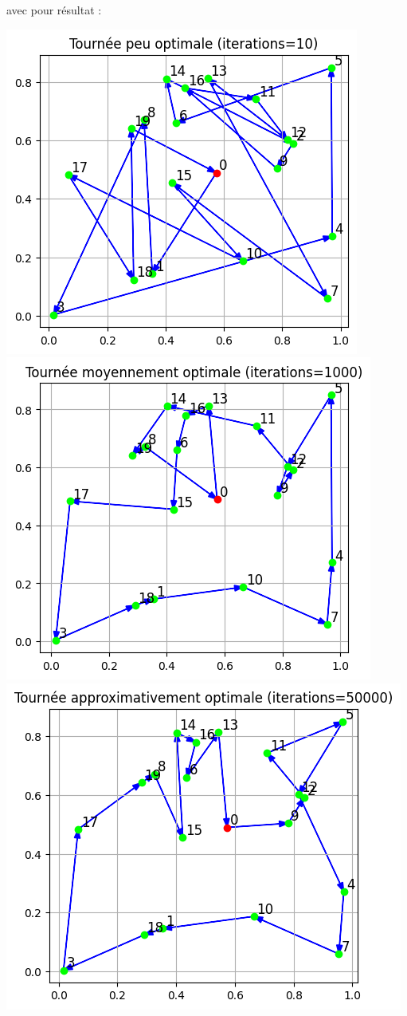 \documentclass{article}
\begin{document}
avec pour résultat :

\includegraphics[scale=0.5]{hm_tsp_10_iter.png}
\includegraphics[scale=0.5]{hm_tsp_1000_iter.png}
\includegraphics[scale=0.5]{hm_tsp_50000_iter.png}
\end{document}

